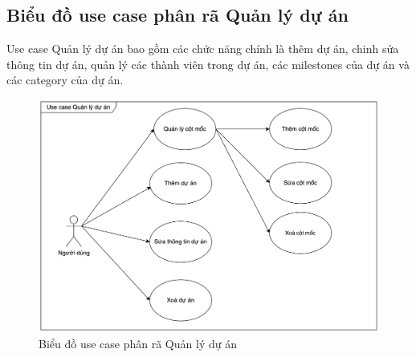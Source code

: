 \documentclass[../DoAn.tex]{subfiles}
\begin{document}
\subsection{Biểu đồ use case phân rã Quản lý dự án}
\label{subsection:2.2.4}
Use case Quản lý dự án bao gồm các chức năng chính là thêm dự án, chinh sửa thông tin dự án, quản lý các thành viên trong dự án,
các milestones của dự án và các category của dự án.
\begin{figure}[H]
    \centering
    \includegraphics[width=1.0\linewidth]{Hinhve/ProjectUseCases.png}
    \caption{Biểu đồ use case phân rã Quản lý dự án}
    \label{fig:ProjectUseCases}
\end{figure}
\newpage

\end{document}
